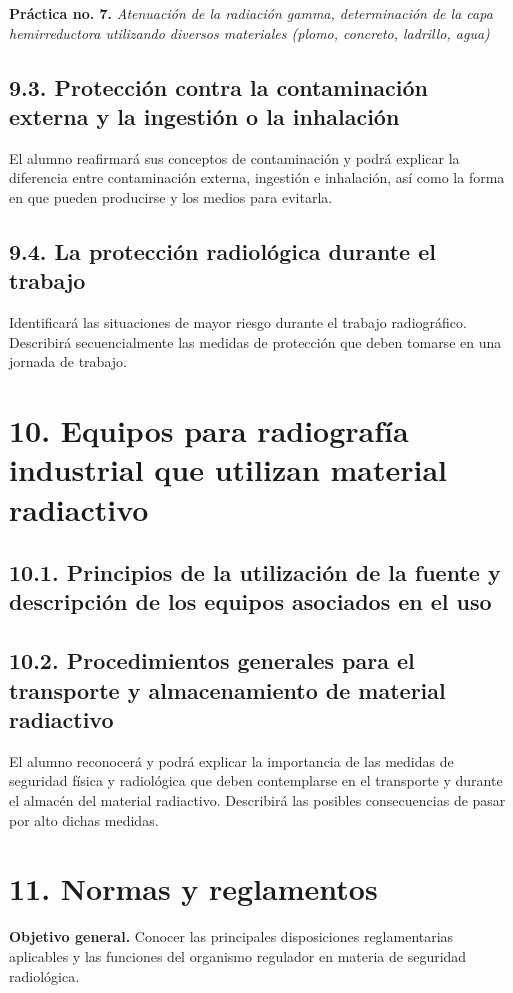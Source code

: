 \textbf{Práctica no. 7.} \emph{Atenuación de la radiación gamma, determinación de la capa hemirreductora utilizando diversos materiales (plomo, concreto, ladrillo, agua)} 

\subsection*{9.3. Protección contra la contaminación externa y la ingestión o la inhalación }
El alumno reafirmará sus conceptos de contaminación y podrá explicar la diferencia entre contaminación externa, ingestión e inhalación, así como la forma en que pueden producirse y los medios para evitarla.

\subsection*{9.4. La protección radiológica durante el trabajo }
Identificará las situaciones de mayor riesgo durante el trabajo radiográfico. Describirá secuencialmente las medidas de protección que deben tomarse en una jornada de trabajo.

\section*{10. Equipos para radiografía industrial que utilizan material radiactivo}

\subsection*{10.1. Principios de la utilización de la fuente y descripción de los equipos asociados en el uso }

\subsection*{10.2. Procedimientos generales para el transporte y almacenamiento de material radiactivo }
El alumno reconocerá y podrá explicar la importancia de las medidas de seguridad física y radiológica que deben contemplarse en el transporte y durante el almacén del material radiactivo. Describirá las posibles consecuencias de pasar por alto dichas medidas.

\section*{11. Normas y reglamentos }
\textbf{Objetivo general.} Conocer las principales disposiciones reglamentarias aplicables y las funciones del organismo regulador en materia de seguridad radiológica.

